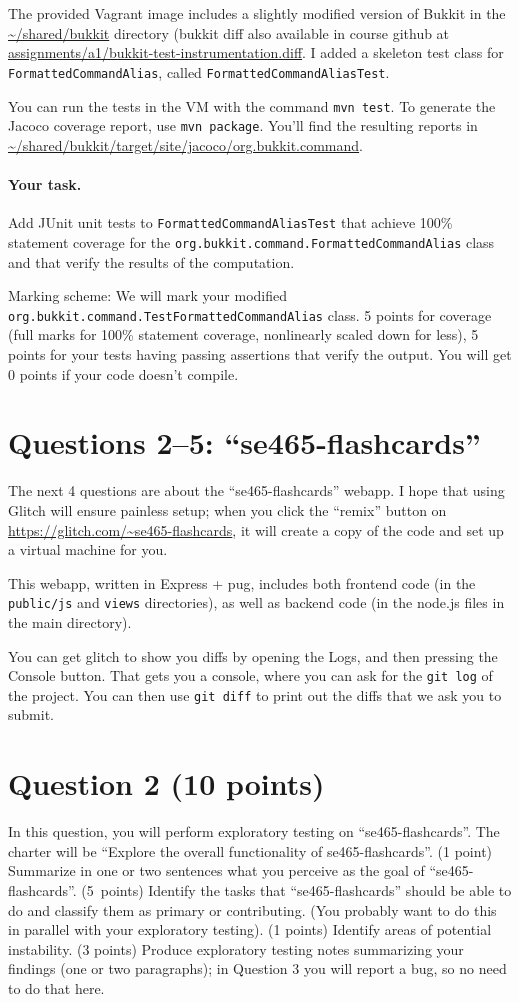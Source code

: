 \documentclass[10pt,hidelinks]{article}
\begin{document}
The provided Vagrant image includes a slightly modified version of
Bukkit in the \url{~/shared/bukkit} directory (bukkit diff also available in course
github at \url{assignments/a1/bukkit-test-instrumentation.diff}.  
I added a skeleton test class for {\tt
  FormattedCommandAlias}, called {\tt FormattedCommandAliasTest}.

You can run the tests in the VM with the command {\tt mvn test}.  To
generate the Jacoco coverage report, use {\tt mvn package}. You'll
find the resulting reports in
\url{~/shared/bukkit/target/site/jacoco/org.bukkit.command}.

\paragraph{Your task.} Add JUnit unit tests to {\tt FormattedCommandAliasTest}
that achieve 100\% statement 
coverage for the {\tt org.bukkit.command.FormattedCommandAlias} class
and that verify the results of the computation.

Marking scheme: We will mark your modified {\tt
  org.bukkit.command.TestFormattedCommandAlias} class.  5 points for
coverage (full marks for 100\% statement coverage, nonlinearly scaled
down for less), 5 points for your tests having passing assertions that
verify the output. You will get 0 points if your code doesn't compile.

\section*{Questions 2--5: ``se465-flashcards''}
The next 4 questions are about the ``se465-flashcards'' webapp.
I hope that using Glitch will ensure painless setup; when you click the
``remix'' button on \url{https://glitch.com/~se465-flashcards},
it will create a copy of the code and set up a virtual machine for you.

This webapp, written in Express + pug, includes both frontend code (in
the {\tt public/js} and {\tt views} directories), as well as backend code
(in the node.js files in the main directory).

You can get glitch to show you diffs by opening the Logs, and then
pressing the Console button. That gets you a console, where you can
ask for the {\tt git log} of the project. You can then use {\tt git diff}
to print out the diffs that we ask you to submit.

\section*{Question 2 (10 points)}
In this question, you will perform exploratory testing on ``se465-flashcards''.
The charter will be ``Explore the overall functionality of
se465-flashcards''. (1 point) Summarize in one or two sentences what you
perceive as the goal of ``se465-flashcards''. (5~points) Identify the tasks
that ``se465-flashcards'' should be able to do and classify them as primary or
contributing. (You probably want to do this in parallel with your
exploratory testing). (1 points) Identify areas of potential
instability. (3 points) Produce exploratory testing notes summarizing
your findings (one or two paragraphs); in Question 3 you will report a
bug, so no need to do that here.
\end{document}
